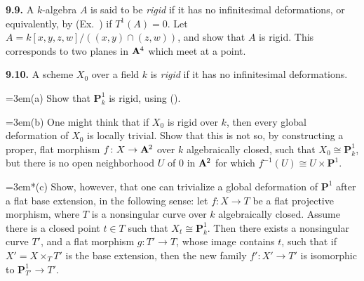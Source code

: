 {\smallskip
\noindent\hypertarget{ex-III-9.9}{}\textbf{9.9.} A $k$-algebra $A$ is said to be \emph{rigid} if it has no infinitesimal deformations, or equivalently, by (Ex.~) if $T^1(A)=0$. Let $A=k[x,y,z,w]/((x,y)\cap(z,w))$, and show that $A$ is rigid. This corresponds to two planes in $\AffSpace{4}$ which meet at a point.

\smallskip
\noindent\hypertarget{ex-III-9.10}{}\textbf{9.10.} A scheme $X_0$ over a field $k$ is \emph{rigid} if it has no infinitesimal deformations.

\noindent\hangindent=3em\hspace*{1.7em}(a) Show that $\mathbf P_k^1$ is rigid, using ().

\noindent\hangindent=3em\hspace*{1.7em}(b) One might think that if $X_0$ is rigid over $k$, then every global deformation of $X_0$ is locally trivial. Show that this is not so, by constructing a proper, flat morphism $f\colon X\to\AffSpace{2}$ over $k$ algebraically closed, such that $X_0\cong\mathbf P_k^1$, but there is no open neighborhood $U$ of $0$ in $\AffSpace{2}$ for which $f^{-1}(U)\cong U\times\mathbf P^1$.

\noindent\hangindent=3em\hspace*{1.4em}*(c) Show, however, that one can trivialize a global deformation of $\mathbf P^1$ after a flat base extension, in the following sense: let $f\colon X\to T$ be a flat projective morphism, where $T$ is a nonsingular curve over $k$ algebraically closed. Assume there is a closed point $t\in T$ such that $X_t\cong\mathbf P_k^1$. Then there exists a nonsingular curve $T'$, and a flat morphism $g\colon T'\to T$, whose image contains $t$, such that if $X'=X\times_T T'$ is the base extension, then the new family $f'\colon X'\to T'$ is isomorphic to $\mathbf P^1_{T'}\to T'$.}
